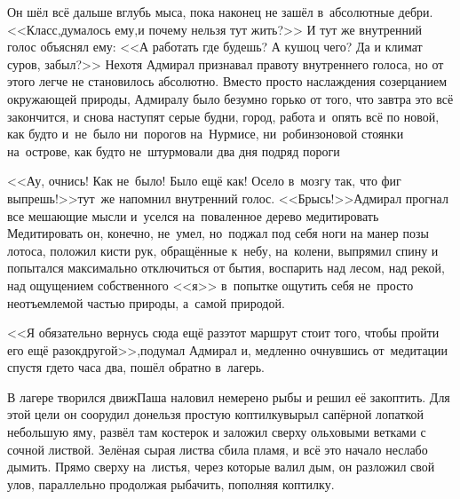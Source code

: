 Он шёл всё дальше вглубь мыса, пока наконец не зашёл в~абсолютные дебри. <<Класс,\mdash думалось ему,\mdash и почему нельзя тут жить?>> И тут же внутренний голос объяснял ему: <<А работать где будешь? А кушоц чего? Да и климат суров, забыл?>> Нехотя Адмирал признавал правоту внутреннего голоса, но от этого легче не становилось абсолютно. Вместо просто наслаждения созерцанием окружающей природы, Адмиралу было безумно горько от того, что завтра это всё закончится, и снова наступят серые будни, город, работа и~опять всё по новой, как будто и~не~было ни~порогов на~Нурмисе, ни~робинзоновой стоянки на~острове, как будто не~штурмовали два дня подряд пороги\myldots{} 

<<Ау, очнись! Как не~было! Было ещё как! Осело в~мозгу так, что фиг выпрешь!>>\mdash тут~же напомнил внутренний голос. <<Брысь!>>\mdash Адмирал прогнал все мешающие мысли и~уселся на~поваленное дерево медитировать\myldots{} Медитировать он, конечно, не~умел, но~поджал под себя ноги на манер позы лотоса, положил кисти рук, обращённые к~небу, на~колени, выпрямил спину и попытался максимально отключиться от бытия, воспарить над лесом, над рекой, над ощущением собственного <<я>> в~попытке ощутить себя не~просто неотъемлемой частью природы, а~самой природой.

<<Я обязательно вернусь сюда ещё раз\mdash этот маршрут стоит того, чтобы пройти его ещё разок\sdash другой>>,\mdash подумал Адмирал и, медленно очнувшись от~медитации спустя где\sdash то часа два, пошёл обратно в~лагерь.


\newpage

В лагере творился движ\mdash Паша наловил немерено рыбы и решил её закоптить. Для этой цели он соорудил донельзя простую коптилку\mdash вырыл сапёрной лопаткой небольшую яму, развёл там костерок и заложил сверху ольховыми ветками с сочной листвой. Зелёная сырая листва сбила пламя, и всё это начало неслабо дымить. Прямо сверху на~листья, через которые валил дым, он разложил свой улов, параллельно продолжая рыбачить, пополняя коптилку.

